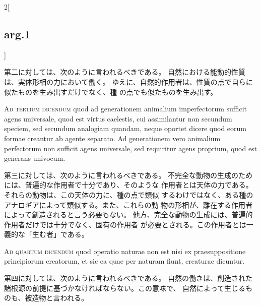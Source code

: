 \documentclass[paper=a4paper,fontsize=10pt,jafontsize=9pt,titlepage]{jlreq}
\begin{document}
\begin{paracol}{2}[\subsection{arg.1}]
\switchcolumn

第二に対しては、次のように言われるべきである。
自然における能動的性質は、実体形相の力において働く。
ゆえに、自然的作用者は、性質の点で自らに似たものを生み出すだけでなく、種
 の点でも似たものを生み出す。

\switchcolumn*[\subsection{ad.3}]

{\scshape Ad tertium dicendum} quod ad generationem
animalium imperfectorum sufficit agens universale, quod est virtus
caelestis, cui assimilantur non secundum speciem, sed secundum analogiam
quandam, neque oportet dicere quod eorum formae creantur ab agente
separato. Ad generationem vero animalium perfectorum non sufficit agens
universale, sed requiritur agens proprium, quod est generans univocum.

\switchcolumn

第三に対しては、次のように言われるべきである。
不完全な動物の生成のためには、普遍的な作用者で十分であり、そのような
 作用者とは天体の力である。それらの動物は、この天体の力に、種の点で類似
 するわけではなく、ある種のアナロギアによって類似する。また、これらの動
 物の形相が、離在する作用者によって創造されると言う必要もない。
他方、完全な動物の生成には、普遍的作用者だけでは十分でなく、固有の作用者
 が必要とされる。この作用者とは一義的な「生む者」である。

\switchcolumn*[\subsection{ad.4}]

{\scshape Ad quartum dicendum} quod operatio naturae non
est nisi ex praesuppositione principiorum creatorum, et sic ea quae per
naturam fiunt, creaturae dicuntur.

\switchcolumn

第四に対しては、次のように言われるべきである。
自然の働きは、創造された諸根源の前提に基づかなければならない。この意味で、
 自然によって生じるものも、被造物と言われる。

\end{paracol}
\end{document}
